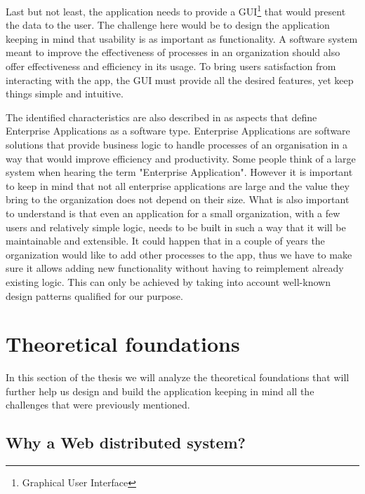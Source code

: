Last but not least, the application needs to provide a GUI\footnote{Graphical User Interface} that would present the data to the user. The challenge here would be to design the application keeping in mind that usability is as important as functionality. A software system meant to improve the effectiveness of processes in an organization should also offer effectiveness and efficiency in its usage. To bring users satisfaction from interacting with the app, the GUI must provide all the desired features, yet keep things simple and intuitive.

The identified characteristics are also described in \cite{patternsOfEnterpriseApplicationArchitecture} as aspects that define Enterprise Applications as a software type. Enterprise Applications are software solutions that provide business logic to handle processes of an organisation in a way that would improve efficiency and productivity. Some people think of a large system when hearing the term "Enterprise Application". However it is important to keep in mind that not all enterprise applications are large and the value they bring to the organization does not depend on their size. What is also important to understand is that even an application for a small organization, with a few users and relatively simple logic, needs to be built in such a way that it will be maintainable and extensible. It could happen that in a couple of years the organization would like to add other processes to the app, thus we have to make sure it allows adding new functionality without having to reimplement already existing logic. This can only be achieved by taking into account well-known design patterns qualified for our purpose.



\section{Theoretical foundations}
\label{section:theoreticalFoundations}

In this section of the thesis we will analyze the theoretical foundations that will further help us design and build the application keeping in mind all the challenges that were previously mentioned.


\subsection{Why a Web distributed system?}
\label{subsection:whyAWebDistributedSystem}

